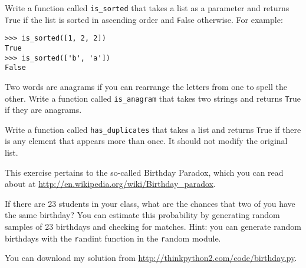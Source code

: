 \documentclass[
DIV=11,
fontsize=12,
twoside,
headinclude=false,
titlepage=firstiscover,
abstract=true,
headsepline=true,
footsepline=true,
chapterprefix=true, %
headings=big,
bibliography=totoc,%
captions=tableheading
]{scrbook}
\theoremstyle{definition}
\begin{document}
\begin{exercise}
\normalfont
Write a function called \verb"is_sorted" that takes a list as a
parameter and returns {\texttt True} if the list is sorted in ascending
order and {\texttt False} otherwise.  For example:

\begin{lstlisting}
>>> is_sorted([1, 2, 2])
True
>>> is_sorted(['b', 'a'])
False
\end{lstlisting}

\end{exercise}


\begin{exercise}
\normalfont
\label{anagram}

Two words are anagrams if you can rearrange the letters from one
to spell the other.  Write a function called \verb"is_anagram"
that takes two strings and returns {\texttt True} if they are anagrams.
\end{exercise}



\begin{exercise}
\normalfont
\label{duplicate}

Write a function called \verb"has_duplicates" that takes
a list and returns {\texttt True} if there is any element that
appears more than once.  It should not modify the original
list.

\end{exercise}


\begin{exercise}
\normalfont

This exercise pertains to the so-called Birthday Paradox, which you
can read about at \url{http://en.wikipedia.org/wiki/Birthday_paradox}.

If there are 23 students in your class, what are the chances
that two of you have the same birthday?  You can estimate this
probability by generating random samples of 23 birthdays
and checking for matches.  Hint: you can generate random birthdays
with the {\texttt randint} function in the {\texttt random} module.

You can download my
solution from \url{http://thinkpython2.com/code/birthday.py}.

\end{exercise}
\end{document}
